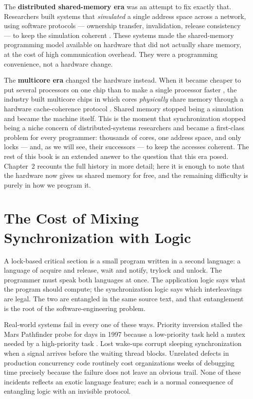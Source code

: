The \textbf{distributed shared-memory era} was an attempt to fix exactly that.
Researchers built systems that \emph{simulated} a single address space across
a network, using software protocols --- ownership transfer, invalidation,
release consistency --- to keep the simulation coherent
\cite{li89dsm,amza96treadmarks}. These systems made the shared-memory
programming model available on hardware that did not actually share memory, at
the cost of high communication overhead. They were a programming convenience,
not a hardware change.

The \textbf{multicore era} changed the hardware instead. When it became
cheaper to put several processors on one chip than to make a single processor
faster \cite{olukotun96case}, the industry built multicore chips in which
cores \emph{physically} share memory through a hardware cache-coherence
protocol \cite{goodman83,papamarcos84,archibald86}. Shared memory stopped
being a simulation and became the machine itself. This is the moment that
synchronization stopped being a niche concern of distributed-systems
researchers and became a first-class problem for every programmer: thousands
of cores, one address space, and only locks --- and, as we will see, their
successors --- to keep the accesses coherent. The rest of this book is an
extended answer to the question that this era posed. Chapter~2 recounts the
full history in more detail; here it is enough to note that the hardware now
gives us shared memory for free, and the remaining difficulty is purely in how
we program it.

\section{The Cost of Mixing Synchronization with Logic}

A lock-based critical section is a small program written in a second language:
a language of acquire and release, wait and notify, trylock and unlock. The
programmer must speak both languages at once. The application logic says what
the program should compute; the synchronization logic says which interleavings
are legal. The two are entangled in the same source text, and that entanglement
is the root of the software-engineering problem.

Real-world systems fail in every one of these ways. Priority inversion stalled
the Mars Pathfinder probe for days in 1997 because a low-priority task held a
mutex needed by a high-priority task \cite{jones97mars,sha90priority}. Lost
wake-ups corrupt sleeping synchronization when a signal arrives before the
waiting thread blocks. Unrelated defects in production concurrency code
routinely cost organizations weeks of debugging time precisely because the
failure does not leave an obvious trail. None of these incidents reflects an
exotic language feature; each is a normal consequence of entangling logic with
an invisible protocol.

